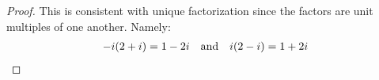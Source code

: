 \begin{proof}
    This is consistent with unique factorization since the factors are unit multiples of one another. Namely:
    \begin{align*} -i(2+i) = 1-2i && \text{and} && i(2-i) = 1+2i \hfill \end{align*}
\end{proof}